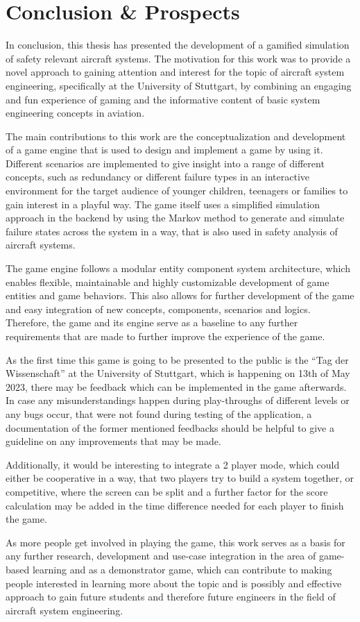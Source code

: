 \chapter{Conclusion \& Prospects}\label{ch:conclusion-&-prospects}
In conclusion, this thesis has presented the development of a gamified simulation of safety relevant aircraft systems.
The motivation for this work was to provide a novel approach to gaining attention and interest for the topic of aircraft
system engineering, specifically at the University of Stuttgart, by combining an engaging and fun experience of gaming and the
informative content of basic system engineering concepts in aviation.

The main contributions to this work are the conceptualization and development of a game engine that is used to
design and implement a game by using it.
Different scenarios are implemented to give insight into a range of different concepts, such as redundancy or different failure types in an
interactive environment for the target audience of younger children, teenagers or families to gain interest in a playful way.
The game itself uses a simplified simulation approach in the backend by using the Markov method to generate and simulate failure states
across the system in a way, that is also used in safety analysis of aircraft systems.

The game engine follows a modular entity component system architecture, which enables flexible, maintainable and highly customizable
development of game entities and game behaviors.
This also allows for further development of the game and easy integration of new concepts, components, scenarios and logics.
Therefore, the game and its engine serve as a baseline to any further requirements that are made to further improve the experience of the game.

As the first time this game is going to be presented to the public is the ``Tag der Wissenschaft'' at the University of Stuttgart, which is happening
on 13th of May 2023, there may be feedback which can be implemented in the game afterwards.
In case any misunderstandings happen during play-throughs of different levels or any bugs occur, that were not found during testing of
the application, a documentation of the former mentioned feedbacks should be helpful to give a guideline on any improvements that may be made.

Additionally, it would be interesting to integrate a 2 player mode, which could either be cooperative in a way, that two players
try to build a system together, or competitive, where the screen can be split and a further factor for the score calculation may be added in the time difference
needed for each player to finish the game.

As more people get involved in playing the game, this work serves as a basis for any further research, development and use-case integration in the area
of game-based learning and as a demonstrator game, which can contribute to making people interested in learning more about the topic and is possibly and effective
approach to gain future students and therefore future engineers in the field of aircraft system engineering.